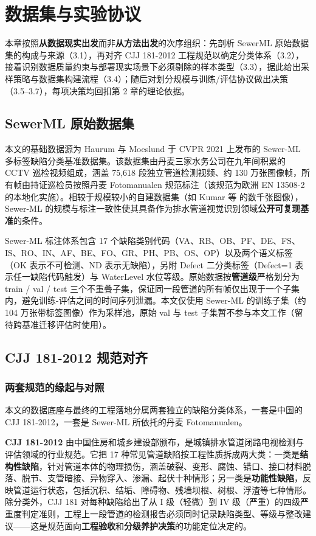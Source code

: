 \documentclass[UTF8,openany,12pt]{ctexbook}
\begin{document}
\chapter{数据集与实验协议}

本章按照\textbf{从数据现实出发}而非\textbf{从方法出发}的次序组织：先剖析 SewerML 原始数据集的构成与来源（3.1），再对齐 CJJ 181-2012 工程规范以确定分类体系（3.2），接着识别数据质量约束与部署现实场景下必须剔除的样本类型（3.3），据此给出采样策略与数据集构建流程（3.4）；随后对划分规模与训练/评估协议做出决策（3.5--3.7），每项决策均回扣第 2 章的理论依据。

\section{SewerML 原始数据集}
\label{sec:dataset-source}

本文的基础数据源为 Haurum 与 Moeslund\cite{haurum2021sewerml} 于 CVPR 2021 上发布的 Sewer-ML 多标签缺陷分类基准数据集。该数据集由丹麦三家水务公司在九年间积累的 CCTV 巡检视频组成，涵盖 75{,}618 段独立管道检测视频、约 130 万张图像帧，所有帧由持证巡检员按照丹麦 Fotomanualen 规范标注（该规范为欧洲 EN 13508-2 的本地化实施）。相较于规模较小的自建数据集（如 Kumar 等\cite{kumar2018cnn} 的数千张图像），Sewer-ML 的规模与标注一致性使其具备作为排水管道视觉识别领域\textbf{公开可复现基准}的条件。

Sewer-ML 标注体系包含 17 个缺陷类别代码（VA、RB、OB、PF、DE、FS、IS、RO、IN、AF、BE、FO、GR、PH、PB、OS、OP）以及两个语义标签（OK 表示不可检测、ND 表示无缺陷），另附 Defect 二分类标签（Defect=1 表示任一缺陷代码触发）与 WaterLevel 水位等级。原始数据按\textbf{管道级}严格划分为 train / val / test 三个不重叠子集，保证同一段管道的所有帧仅出现于一个子集内，避免训练-评估之间的时间序列泄漏。本文仅使用 Sewer-ML 的训练子集（约 104 万张带标签图像）作为采样池，原始 val 与 test 子集暂不参与本文工作（留待跨基准迁移评估时使用）。

\section{CJJ 181-2012 规范对齐}
\label{sec:cjj-mapping}

\subsection{两套规范的缘起与对照}
本文的数据底座与最终的工程落地分属两套独立的缺陷分类体系，一套是中国的 CJJ 181-2012，一套是 Sewer-ML 所依托的丹麦 Fotomanualen。

\textbf{CJJ 181-2012}\cite{cjj181} 由中国住房和城乡建设部颁布，是城镇排水管道闭路电视检测与评估领域的行业规范。它把 17 种常见管道缺陷按工程性质拆成两大类：一类是\textbf{结构性缺陷}，针对管道本体的物理损伤，涵盖破裂、变形、腐蚀、错口、接口材料脱落、脱节、支管暗接、异物穿入、渗漏、起伏十种情形；另一类是\textbf{功能性缺陷}，反映管道运行状态，包括沉积、结垢、障碍物、残墙坝根、树根、浮渣等七种情形。除分类外，CJJ 181 对每种缺陷给出了从 I 级（轻微）到 IV 级（严重）的四级严重度判定准则，工程上一段管道的检测报告必须同时记录缺陷类型、等级与整改建议——这是规范面向\textbf{工程验收}和\textbf{分级养护决策}的功能定位决定的。
\end{document}
